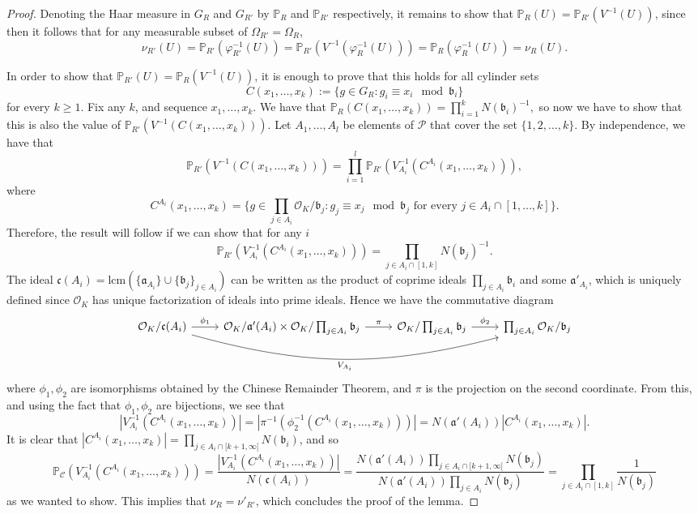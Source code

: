 \documentclass[a4paper,11pt,reqno]{amsart}
\theoremstyle{plain}
\theoremstyle{remark}
\newcommand{\cc}{\mathcal{C}}
\newcommand{\co}{\mathcal{O}}
\newcommand{\cp}{\mathcal{P}}
\newcommand{\ga}{\mathfrak{a}}
\newcommand{\gb}{\mathfrak{b}}
\newcommand{\gc}{\mathfrak{c}}
\newcommand{\mmp}{\mathbb{P}}
\begin{document}
\begin{proof}
				Denoting the Haar measure in $G_R$ and $G_{R'}$ by $\mmp_R$ and $\mmp_{R'}$ respectively, it remains to show that $\mmp_R(U) = \mmp_{R'}(V^{-1}(U))$, since then it follows that for any measurable subset of $\Omega_{R'} = \Omega_{R}$, $$\nu_{R'}(U) =\mmp_{R'}(\varphi_{R'}^{-1}(U)) = \mmp_{R'}(V^{-1}(\varphi_{R}^{-1}(U))) = \mmp_R(\varphi_{R}^{-1}(U)) = \nu_R(U). $$
				
				In order to show that $\mmp_{R'}(U) = \mmp_R(V^{-1}(U))$, it is enough to prove that this holds for all cylinder sets $$C(x_1,\dots,x_k) := \{g \in G_R:g_i \equiv x_i \mod \gb_i\}$$ for every $k \geq 1$. Fix any $k$, and sequence $x_1,\dots,x_k$. We have that $\mmp_R(C(x_1,\dots,x_k)) = \prod_{i=1}^k N(\gb_i)^{-1},$ so now we have to show that this is also the value of $\mmp_{R'}(V^{-1}(C(x_1,\dots,x_k))).$ Let $A_1,\dots, A_l$ be elements of $\cp$ that cover the set $\{1,2,\dots,k\}$. By independence, we have that $$\mmp_{R'}(V^{-1}(C(x_1,\dots,x_k))) = \prod_{i=1}^l \mmp_{R'}(V_{A_i}^{-1}(C^{A_i}(x_1,\dots,x_k))),$$ where $$C^{A_i}(x_1,\dots,x_k) = \{g \in \prod_{j \in A_i} \co_K/\gb_j: g_j \equiv x_j \mod \gb_j \text{ for every } j \in A_i \cap [1,\dots,k]\}.$$
				Therefore, the result will follow if we can show that for any $i$ $$\mmp_{R'}(V_{A_i}^{-1}(C^{A_i}(x_1,\dots,x_k))) = \prod_{j \in A_i\cap [1,k]} N(\gb_j)^{-1}.$$ The ideal $\gc(A_i) = \text{lcm}(\{\ga_{A_i}\} \cup \{\gb_j\}_{j \in A_i} )$ can be written as the product of coprime ideals $\prod_{j \in A_i} \gb_i$ and some $\ga'_{A_i}$, which is uniquely defined since $\co_K$ has unique factorization of ideals into prime ideals. Hence  we have the commutative diagram
				\[\begin{tikzcd}
					{\co_K/\gc(A_i)} & {\co_K/\ga'(A_i)\times\co_K/\prod_{j\in A_i}\gb_j} & {\co_K/\prod_{j\in A_i}\gb_j} & {\prod_{j\in A_i}\co_K/\gb_j}
					\arrow["{\phi_1}", from=1-1, to=1-2]
					\arrow["V_{A_i}"', bend right=15, from=1-1, to=1-4]
					\arrow["\pi", from=1-2, to=1-3]
					\arrow["{\phi_2}", from=1-3, to=1-4]
				\end{tikzcd}\] 
				where $\phi_1, \phi_2$ are isomorphisms obtained by the Chinese Remainder Theorem, and $\pi$ is the projection on the second coordinate. From this, and using the fact that $\phi_1,\phi_2$ are bijections, we see that $$|V_{A_i}^{-1}(C^{A_i}(x_1,\dots,x_k))| = |\pi^{-1}(\phi_2^{-1}(C^{A_i}(x_1,\dots,x_k)))| = N(\ga'(A_i))|C^{A_i}(x_1,\dots,x_k)|.  $$  It is clear that $|C^{A_i}(x_1,\dots,x_k)| = \prod_{j \in A_i \cap [k+1,\infty[} N(\gb_i)$, and so $$\mmp_\cc(V_{A_i}^{-1}(C^{A_i}(x_1,\dots,x_k))) = \frac{|V_{A_i}^{-1}(C^{A_i}(x_1,\dots,x_k))|}{N(\gc(A_i))} = \frac{N(\ga'(A_i))\prod_{j \in A_i \cap [k+1,\infty[}N(\gb_j)}{N(\ga'(A_i)) \prod_{j \in A_i} N(\gb_j)} = \prod_{j \in A_i\cap [1,k]} \frac{1}{N(\gb_j)} $$ as we wanted to show. This implies that $\nu_R = \nu'_{R'}$, which concludes the proof of the lemma.
			\end{proof}
			
\end{document}
